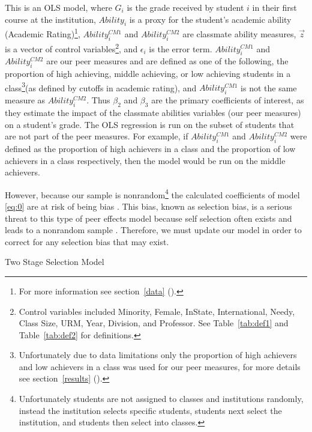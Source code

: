 \documentclass[12pt,a4paper,english,fleqn]{article}
\makeatletter
\newcommand{\sectlabel}[1]{section~\ref{#1} (\nameref{#1})}
\newcommand{\tablelabel}[1]{Table~\ref{#1}}
\renewcommand\subsection{\@startsection{subsection}{2}
{\z@}{-3.25ex\@plus -1ex \@minus -.2ex}{1.5ex \@plus .2ex}{\normalfont\bf}}
\makeatother
\begin{document}
This is an OLS model, where $G_{i}$ is the grade received by student $i$ in their first course at the institution, $Ability_{i}$ is a proxy for the student's academic ability (Academic Rating)\footnote{For more information see \sectlabel{data}.}, $Ability_{i}^{CM1}$ and $Ability_{i}^{CM2}$ are classmate ability measures, $\overrightarrow{z}$ is a vector of control variables\footnote{Control variables included Minority, Female, InState, International, Needy, Class Size, URM, Year, Division, and Professor. See \tablelabel{tab:def1} and \tablelabel{tab:def2} for definitions.}, and $\epsilon_{i}$ is the error term. 
$Ability_{i}^{CM1}$ and $Ability_{i}^{CM2}$ are our peer measures and are defined as one of the following, the proportion of high achieving, middle achieving, or low achieving students in a class\footnote{Unfortunately due to data limitations only the proportion of high achievers and low achievers in a class was used for our peer measures, for more details see \sectlabel{results}.}(as defined by cutoffs in academic rating), and $Ability_{i}^{CM1}$ is not the same measure as  $Ability_{i}^{CM2}$. 
Thus $\beta_{2}$ and $\beta_{3}$ are the primary coefficients of interest, as they estimate the impact of the classmate abilities variables (our peer measures) on a student's grade. 
The OLS regression is run on the subset of students that are not part of the peer measures. 
For example, if $Ability_{i}^{CM1}$ and $Ability_{i}^{CM2}$ were defined as the proportion of high achievers in a class and the proportion of low achievers in a class respectively, then the model would be run on the middle achievers. 

However, because our sample is nonrandom\footnote{Unfortunately students are not assigned to classes and institutions randomly, instead the institution selects specific students, students next select the institution, and students then select into classes.} the calculated coefficients of model \eqref{eq:0} are at risk of being bias \citep{heckman1979sample}. This bias, known as selection bias, is a serious threat to this type of peer effects model because self selection often exists and leads to a nonrandom sample \citep{carman2012classroom,betts2003determinants,ding2007peers}. Therefore, we must update our model in order to correct for any selection bias that may exist.

\subsection{Two Stage Selection Model}\label{tssmodel}
\end{document}
